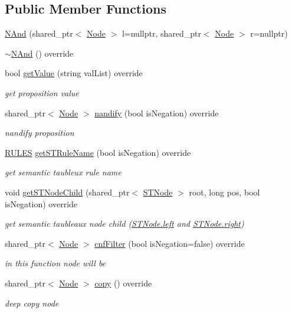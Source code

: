 \subsection*{Public Member Functions}
\begin{DoxyCompactItemize}
\item 
\hyperlink{class_n_and_a5e73ac719f793d02a10cd0fc6931808f}{N\+And} (shared\+\_\+ptr$<$ \hyperlink{class_node}{Node} $>$ l=nullptr, shared\+\_\+ptr$<$ \hyperlink{class_node}{Node} $>$ r=nullptr)
\item 
\hyperlink{class_n_and_a472d8c586ec989b998d6b182ed581a96}{$\sim$\+N\+And} () override
\item 
bool \hyperlink{class_n_and_a9eb3a117e8d30f11ebe25e932d387265}{get\+Value} (string val\+List) override
\begin{DoxyCompactList}\small\item\em get proposition value \end{DoxyCompactList}\item 
shared\+\_\+ptr$<$ \hyperlink{class_node}{Node} $>$ \hyperlink{class_n_and_ae60ecc244dd83bfdcc7eada4957890d8}{nandify} (bool is\+Negation) override
\begin{DoxyCompactList}\small\item\em nandify proposition \end{DoxyCompactList}\item 
\hyperlink{proposition_2tableaux_2enum_8h_a70c93904c6a27d228050f922eb4fc3b8}{R\+U\+L\+ES} \hyperlink{class_n_and_a8570a747f7f4aec32bb962227749566f}{get\+S\+T\+Rule\+Name} (bool is\+Negation) override
\begin{DoxyCompactList}\small\item\em get semantic taubleux rule name \end{DoxyCompactList}\item 
void \hyperlink{class_n_and_a3ccedba07752a2457a593035b33535e1}{get\+S\+T\+Node\+Child} (shared\+\_\+ptr$<$ \hyperlink{class_s_t_node}{S\+T\+Node} $>$ root, long pos, bool is\+Negation) override
\begin{DoxyCompactList}\small\item\em get semantic taubleaux node child (\hyperlink{class_s_t_node_a19ba8bab4660bdeee0e897687b451a8b}{S\+T\+Node.\+left} and \hyperlink{class_s_t_node_a66d06118063fb739058f91c75b725e27}{S\+T\+Node.\+right}) \end{DoxyCompactList}\item 
shared\+\_\+ptr$<$ \hyperlink{class_node}{Node} $>$ \hyperlink{class_n_and_a2df64f0858e90841201a2acaf50ac587}{cnf\+Filter} (bool is\+Negation=false) override
\begin{DoxyCompactList}\small\item\em in this function node will be \end{DoxyCompactList}\item 
shared\+\_\+ptr$<$ \hyperlink{class_node}{Node} $>$ \hyperlink{class_n_and_a3756b0f2696bf06664100c0b5c9d67b3}{copy} () override
\begin{DoxyCompactList}\small\item\em deep copy node \end{DoxyCompactList}\end{DoxyCompactItemize}
